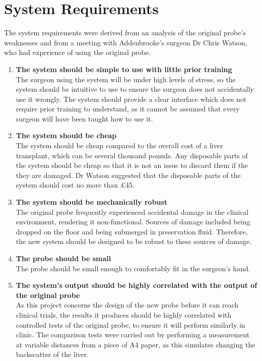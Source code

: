 \section{System Requirements}

The system requirements were derived from an analysis of the original probe's weaknesses and from a meeting with Addenbrooke's surgeon Dr Chris Watson, who had experience of using the original probe.


\begin{enumerate}
\item \label{req: simple} \textbf{The system should be simple to use with little prior training}\\
The surgeon using the system will be under high levels of stress, so the system should be intuitive to use to ensure the surgeon does not accidentally use it wrongly. The system should provide a clear interface which does not require prior training to understand, as it cannot be assumed that every surgeon will have been taught how to use it.

\item \label{req: cheap} \textbf{The system should be cheap}\\
The system should be cheap compared to the overall cost of a liver transplant, which can be several thousand pounds. Any disposable parts of the system should be cheap so that it is not an issue to discard them if the they are damaged. Dr Watson suggested that the disposable parts of the system should cost no more than £45.

\item \label{req: robust} \textbf{The system should be mechanically robust}\\
The original probe frequently experienced accidental damage in the clinical environment, rendering it non-functional. Sources of damage included being dropped on the floor and being submerged in preservation fluid. Therefore, the new system should be designed to be robust to these sources of damage.

\item \label{req: small} \textbf{The probe should be small}\\
The probe should be small enough to comfortably fit in the surgeon's hand.


\item \label{req: correlation} \textbf{The system's output should be highly correlated with the output of the original probe}\\
As this project concerns the design of the new probe before it can reach clinical trials, the results it produces should be highly correlated with controlled tests of the original probe, to ensure it will perform similarly in clinic. The comparison tests were carried out by performing a measurement at variable distances from a piece of A4 paper, as this simulates changing the backscatter of the liver.




\end{enumerate}
